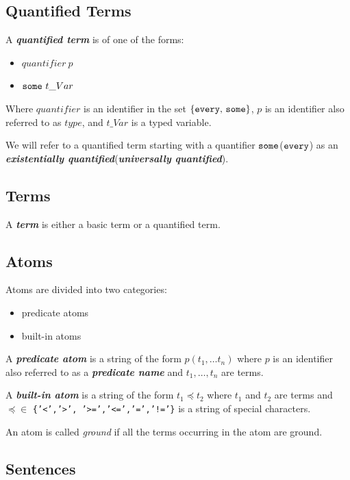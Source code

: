 \documentclass[a4paper,10pt]{article}
\begin{document}
\subsection{Quantified Terms}

A \textit{\textbf{quantified term}} is of one of the forms:
\begin{itemize}
\item $ quantifier~p $
\item $ \mbox{\texttt{some}}~t\_Var$
\end{itemize} 


Where $quantifier$ is an identifier in the set $\{\mbox{\texttt{every}, \texttt{some}}\}$, $p$ is an identifier also referred to as $type$,  and $t\_Var$ is a typed variable.

We will refer to a quantified term starting with a quantifier $\mbox{\texttt{some}}$($\mbox{\texttt{every}}$) as an \textbf{\textit{existentially quantified}}(\textbf{\textit{universally quantified}}).  


\subsection{Terms}
A \textit{\textbf{term}} is either a basic term or a quantified term.
\subsection{Atoms}

Atoms are divided into two categories:
\begin{itemize}
\item predicate atoms
\item built-in atoms
\end{itemize}

A \textit{\textbf{predicate atom}} is a string of the form $p(t_1,\ldots t_n)$ where 
$p$ is an identifier also referred to as a \textbf{\textit{predicate name}} and $t_1,\ldots,t_n$ are terms.

A \textit{\textbf{built-in atom}} is a string of the form $t_1 \preceq t_2$ where $t_1$ and $t_2$ are terms and $\preceq \in$ \texttt{\{'<','>', '>=','<=','=','!='\}} is a string of special characters.

An atom is called \textit{ground} if all the terms occurring in the atom are ground.
\subsection{Sentences}
\end{document}
